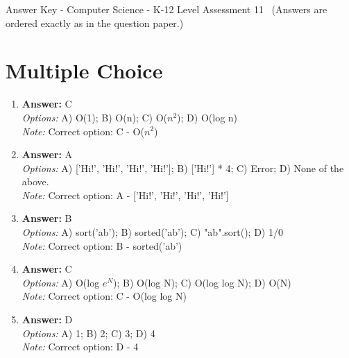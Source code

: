 \documentclass[12pt]{article}
\begin{document}
\begin{center}
Answer Key - Computer Science - K-12 Level Assessment 11 \
\small (Answers are ordered exactly as in the question paper.)
\end{center}

\section*{Multiple Choice}
\begin{enumerate}[label=\arabic*.]
\item \textbf{Answer:} C
\\ \textit{Options:} A) O(1); B) O(n); C) O($n^2$); D) O(log n)
\\ \textit{Note:} Correct option: C - O($n^2$)
\item \textbf{Answer:} A
\\ \textit{Options:} A) ['Hi!', 'Hi!', 'Hi!', 'Hi!']; B) ['Hi!'] * 4; C) Error; D) None of the above.
\\ \textit{Note:} Correct option: A - ['Hi!', 'Hi!', 'Hi!', 'Hi!']
\item \textbf{Answer:} B
\\ \textit{Options:} A) sort('ab'); B) sorted('ab'); C) "ab".sort(); D) 1/0
\\ \textit{Note:} Correct option: B - sorted('ab')
\item \textbf{Answer:} C
\\ \textit{Options:} A) O(log $e^N$); B) O(log N); C) O(log log N); D) O(N)
\\ \textit{Note:} Correct option: C - O(log log N)
\item \textbf{Answer:} D
\\ \textit{Options:} A) 1; B) 2; C) 3; D) 4
\\ \textit{Note:} Correct option: D - 4
\end{enumerate}
\end{document}
